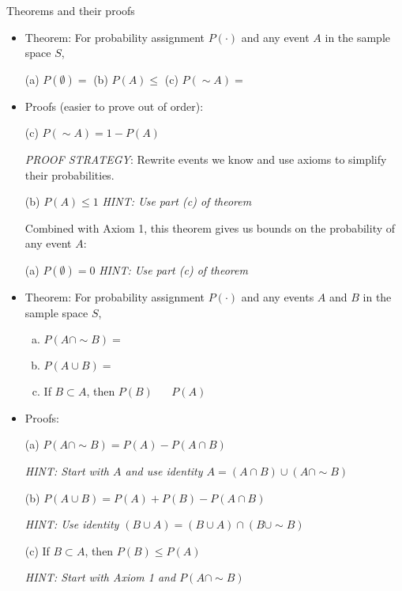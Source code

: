\documentclass{article}
\newcommand{\comp}[1]{{\sim}#1}		%
\begin{document}
Theorems and their proofs\bigskip
\begin{itemize}
    \item Theorem: For probability assignment $P(\cdot)$ and any event $A$ in the sample space $S$,\\
    \item[] \hspace{10pt} (a) $P(\emptyset) = $ \hfill (b) $P(A) \le $ \hfill (c) $P(\comp A) = $\hspace{100pt}
    \newpage
    \item Proofs (easier to prove out of order):\\  
    \item[(c)] $P(\comp A) = 1 - P(A)$
    \item[] \textit{PROOF STRATEGY}: Rewrite events we know and use axioms to simplify their probabilities.\vspace{120pt}
    \item[(b)] $P(A) \le 1$ \hfill \textit{HINT: Use part (c) of theorem} \vspace{100pt} 
    \item[] Combined with Axiom 1, this theorem gives us bounds on the probability of any event $A$:\vspace{20pt}
    \item[(a)] $P(\emptyset) = 0$ \hfill \textit{HINT: Use part (c) of theorem} \vfill 
    \item Theorem: For probability assignment $P(\cdot)$ and any events $A$ and $B$ in the sample space $S$,\\
    \begin{enumerate}[(a)]
        \item $P(A \cap \comp{B}) = $\\
        \item $P(A \cup B) = $\\
        \item If $B \subset A$, then $P(B) \hspace{20pt} P(A)$
    \end{enumerate}
    \newpage
    \item Proofs:\\
    \item[(a)] $P(A \cap \comp B) = P(A) - P(A \cap B)$
    \item[]  \textit{HINT:  Start with $A$ and use identity $A = (A \cap B) \cup (A \cap \comp{B})$} \vspace{170pt}
    \item[(b)] $P(A \cup B) = P(A) + P(B) - P(A \cap B)$
    \item[] \textit{HINT: Use identity $(B \cup A) = (B \cup A) \cap (B \cup \comp{B})$} \vspace{220pt}
    \item[(c)] If $B \subset A$, then $P(B) \le P(A)$
    \item[] \textit{HINT: Start with Axiom 1 and $P(A \cap \comp{B})$} \vspace{120pt}
\end{itemize}\bigskip
\end{document}
